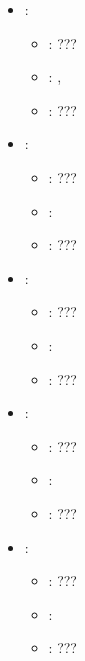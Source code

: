 \begin{itemize}
    \item {}:
           \begin{itemize}
                \item \optionPossibleValues{}: ???
                \item \optionDefaultValue{}: , 
                \item \optionDescrption{}: ???
           \end{itemize}
    \item {}:
           \begin{itemize}
                \item \optionPossibleValues{}: ???
                \item \optionDefaultValue{}: 
                \item \optionDescrption{}: ???
           \end{itemize}
    \item {}:
           \begin{itemize}
                \item \optionPossibleValues{}: ???
                \item \optionDefaultValue{}: 
                \item \optionDescrption{}: ???
           \end{itemize}
    \item {}:
           \begin{itemize}
                \item \optionPossibleValues{}: ???
                \item \optionDefaultValue{}: 
                \item \optionDescrption{}: ???
           \end{itemize}
    \item {}:
           \begin{itemize}
                \item \optionPossibleValues{}: ???
                \item \optionDefaultValue{}: 
                \item \optionDescrption{}: ???
           \end{itemize}
\end{itemize}
